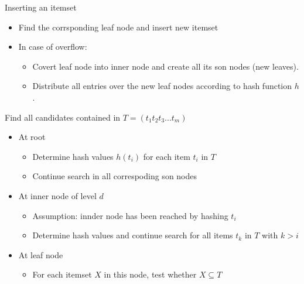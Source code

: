 \documentclass[../notes.tex]{subfiles}
\begin{document}
Inserting an itemset 
\begin{itemize}
  \item Find the corrsponding leaf node and insert new itemset
  \item In case of overflow:
  \begin{itemize}
    \item Covert leaf node into inner node and create all its son nodes (new leaves).
    \item Distribute all entries over the new leaf nodes according to hash function $h$.
  \end{itemize}
\end{itemize}

\newpage

Find all candidates contained in $T = (t_1 t_2 t_3 ... t_m)$
\begin{itemize}
  \item At root
  \begin{itemize}
    \item Determine hash values $h(t_i)$ for each item $t_i$ in $T$
    \item Continue search in all correspoding son nodes
  \end{itemize}

  \item At inner node of level $d$
  \begin{itemize}
    \item Assumption: innder node has been reached by hashing $t_i$
    \item Determine hash values and continue search for all items $t_k$ in $T$ with $k > i$
  \end{itemize}

  \item At leaf node
  \begin{itemize}
    \item For each itemset $X$ in this node, test whether $X \subseteq T$
  \end{itemize}
\end{itemize}
\end{document}
